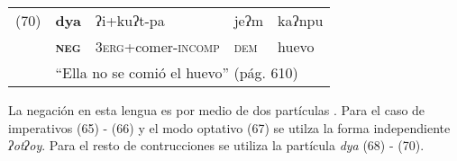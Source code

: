 {%
\begin{tabular}{lllll}
(70) & \textbf{dya} & ʔi+kuʔt-pa & jeʔm & kaʔnpu \\
& \textsc{\textbf{neg}} & \textsc{3erg}+comer-\textsc{incomp} & \textsc{dem} & huevo \\
& \multicolumn{4}{l}{``Ella no se comió el huevo'' (pág. 610)}
\end{tabular} \vspace{0.5cm}

}

La negación en esta lengua es por medio de dos partículas \textcolor{MidnightBlue}{\citep{Popoluca}}. Para el caso de imperativos (65) - (66) y el modo optativo (67) se utilza la forma independiente {\setmainfont{Charis SIL} \textit{ʔotʔoy}}. Para el resto de contrucciones se utiliza la partícula {\setmainfont{Charis SIL} \textit{dya}} (68) - (70).